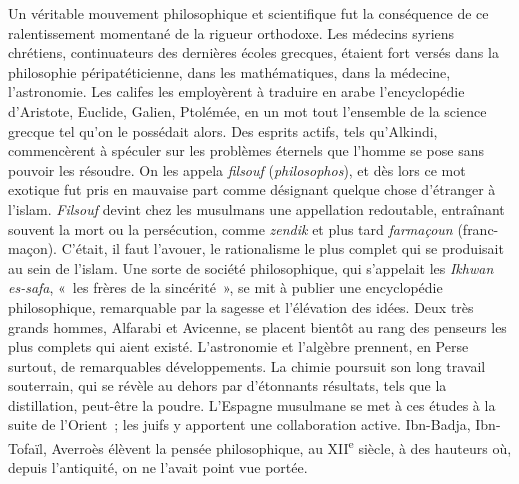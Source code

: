 \documentclass[french,twoside]{book} %
\newcommand\orgName[1]{#1}
\newcommand\persName[1]{#1}
\begin{document}
Un véritable mouvement philosophique et scientifique fut la conséquence de ce ralentissement momentané de la rigueur orthodoxe. Les médecins syriens chrétiens, continuateurs des dernières écoles grecques, étaient fort versés dans la philosophie péripatéticienne, dans les mathématiques, dans la médecine, l’astronomie. Les califes les employèrent à traduire en arabe l’encyclopédie d’{\persName Aristote}, {\persName Euclide}, {\persName Galien}, {\persName Ptolémée}, en un mot tout l’ensemble de la science grecque tel qu’on le possédait alors. Des esprits actifs, tels qu’{\persName Alkindi}, commencèrent à spéculer sur les problèmes éternels que l’homme se pose sans pouvoir les résoudre. On les appela {\itshape filsouf} ({\itshape philosophos}), et dès lors ce mot exotique fut pris en mauvaise part comme désignant quelque chose d’étranger à l’islam. {\itshape Filsouf} devint chez les musulmans une appellation redoutable, entraînant souvent la mort ou la persécution, comme {\itshape zendik} et plus tard {\itshape farmaçoun} (franc-maçon). C’était, il faut l’avouer, le rationalisme le plus complet qui se produisait au sein de l’islam. Une sorte de société philosophique, qui s’appelait les {\itshape Ikhwan es-safa}, « les frères de la sincérité », se mit à publier une encyclopédie philosophique, remarquable par la sagesse et l’élévation des idées. Deux très grands hommes, {\persName Alfarabi} et {\persName Avicenne}, se placent bientôt au rang des penseurs les plus complets qui aient existé. L’astronomie et l’algèbre prennent, en Perse surtout, de remarquables développements. La chimie poursuit son long travail souterrain, qui se révèle au dehors par d’étonnants résultats, tels que la distillation, peut-être la poudre. L’{\orgName Espagne musulmane} se met à ces études à la suite de l’{\orgName Orient} ; les juifs y apportent une collaboration active. {\persName Ibn-Badja}, {\persName Ibn-Tofaïl}, {\persName Averroès} élèvent la pensée philosophique, au XII\textsuperscript{e} siècle, à des hauteurs où, depuis l’antiquité, on ne l’avait point vue portée.\par
\end{document}
